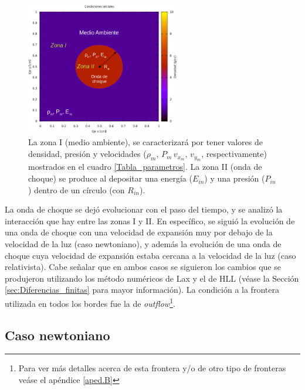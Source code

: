 \documentclass[12pt,a4paper]{book}
\begin{document}
\begin{figure}
\centering
\includegraphics[width=0.6\textwidth]{./Figuras/Pruebas/Prueba_onda_choque/prueba_example}
\caption{\label{fig:onda_choque_example}La zona I (medio ambiente), se caracterizará por tener valores de densidad, presión y velocidades ($\rho_m, \, P_m \, v_{x_m}, \, v_{y_m}$, respectivamente) mostrados en el cuadro \ref{Tabla_parametros}. La zona II (onda de choque) se produce al depositar una energía ($E_{in}$) y una presión ($P_{in}$) dentro de un círculo (con $R_{in}$).}
\end{figure}

La onda de choque se dejó evolucionar con el paso del tiempo, y se analizó la interacción que hay entre las zonas I y II. En específico, se siguió la evolución de una onda de choque con una velocidad de expansión muy por debajo de la velocidad de la luz (caso newtoniano), y además la evolución de una onda de choque cuya velocidad de expansión estaba cercana a la velocidad de la luz (caso relativista). Cabe señalar que en ambos casos se siguieron los cambios que se produjeron utilizando los método numéricos de Lax y el de HLL (véase la Sección \ref{sec:Diferencias_finitas} para mayor información). La condición a la frontera utilizada en todos los bordes fue la de \emph{outflow}\footnote{Para ver más detalles acerca de esta frontera y/o de otro tipo de fronteras veáse el apéndice \ref{aped.B}}. 





\subsection{Caso newtoniano} 
\end{document}
